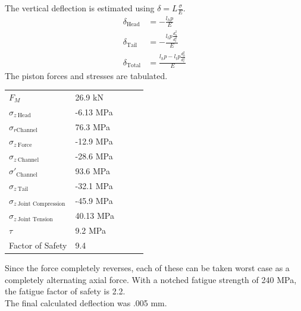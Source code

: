 \documentclass[10pt,a4paper]{article}
\begin{document}
	The vertical deflection is estimated using $\delta = L \frac{\sigma}{E}$.
	\begin{align}
		\delta_{\text{Head}} &= - \frac{l_h p}{E}\\ 
		\delta_{\text{Tail}} &= - \frac{l_t p \frac{d_h^2}{d_t^2}}{E}\\ 
		\delta_{\text{Total}} &=  \frac{l_h p -l_t p \frac{d_h^2}{d_t^2}}{E}
	\end{align}
	The piston forces and stresses are tabulated.
\begin{table}[H]
\begin{tabular}{lllll}
 $F_M$ & 26.9 kN \\
 $\sigma_{z\ \text{Head}}$& -6.13 MPa \\
 $\sigma_{r \text{Channel}}$ & 76.3 MPa \\
 $\sigma_{z\ \text{Force}}$ & -12.9 MPa \\
 $\sigma_{z\ \text{Channel}}$& -28.6 MPa \\
 $\sigma'_{\text{Channel}}$ &  93.6 MPa \\
 $\sigma_{z\ \text{Tail}}$&  -32.1 MPa \\
 $\sigma_{z\ \text{Joint Compression}}$ & -45.9 MPa\\
 $\sigma_{z\ \text{Joint Tension}}$ & 40.13 MPa\\
 $\tau$ & 9.2 MPa\\
 Factor of Safety & 9.4
\end{tabular}
\end{table}
Since the force completely reverses, each of these can be taken worst case as a completely alternating axial force. With a notched fatigue strength of 240 MPa, the fatigue factor of safety is 2.2.\\
The final calculated deflection was .005 mm.
\newpage
\end{document}
